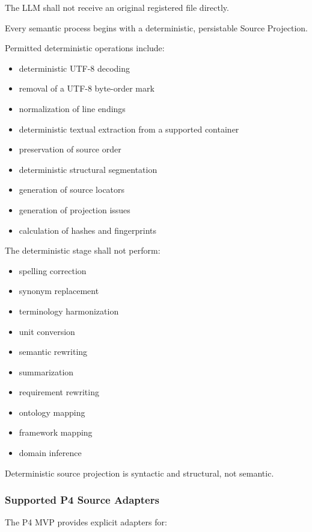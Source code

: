 The LLM shall not receive an original registered file directly.

Every semantic process begins with a deterministic, persistable Source Projection.

Permitted deterministic operations include:

\begin{itemize}
\tightlist
\item
  deterministic UTF-8 decoding
\item
  removal of a UTF-8 byte-order mark
\item
  normalization of line endings
\item
  deterministic textual extraction from a supported container
\item
  preservation of source order
\item
  deterministic structural segmentation
\item
  generation of source locators
\item
  generation of projection issues
\item
  calculation of hashes and fingerprints
\end{itemize}

The deterministic stage shall not perform:

\begin{itemize}
\tightlist
\item
  spelling correction
\item
  synonym replacement
\item
  terminology harmonization
\item
  unit conversion
\item
  semantic rewriting
\item
  summarization
\item
  requirement rewriting
\item
  ontology mapping
\item
  framework mapping
\item
  domain inference
\end{itemize}

Deterministic source projection is syntactic and structural, not semantic.

\hypertarget{supported-p4-source-adapters}{%
\subsubsection{Supported P4 Source Adapters}\label{supported-p4-source-adapters}}

The P4 MVP provides explicit adapters for:

